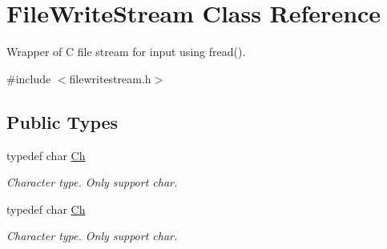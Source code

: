 \hypertarget{class_file_write_stream}{}\section{File\+Write\+Stream Class Reference}
\label{class_file_write_stream}


Wrapper of C file stream for input using fread().  




{\ttfamily \#include $<$filewritestream.\+h$>$}

\subsection*{Public Types}
\begin{DoxyCompactItemize}
\item 
typedef char \hyperlink{class_file_write_stream_abc16aeb69ad4176263ddfcb837fb7b49}{Ch}\hypertarget{class_file_write_stream_abc16aeb69ad4176263ddfcb837fb7b49}{}\label{class_file_write_stream_abc16aeb69ad4176263ddfcb837fb7b49}

\begin{DoxyCompactList}\small\item\em Character type. Only support char. \end{DoxyCompactList}\item 
typedef char \hyperlink{class_file_write_stream_abc16aeb69ad4176263ddfcb837fb7b49}{Ch}\hypertarget{class_file_write_stream_abc16aeb69ad4176263ddfcb837fb7b49}{}\label{class_file_write_stream_abc16aeb69ad4176263ddfcb837fb7b49}

\begin{DoxyCompactList}\small\item\em Character type. Only support char. \end{DoxyCompactList}\end{DoxyCompactItemize}
